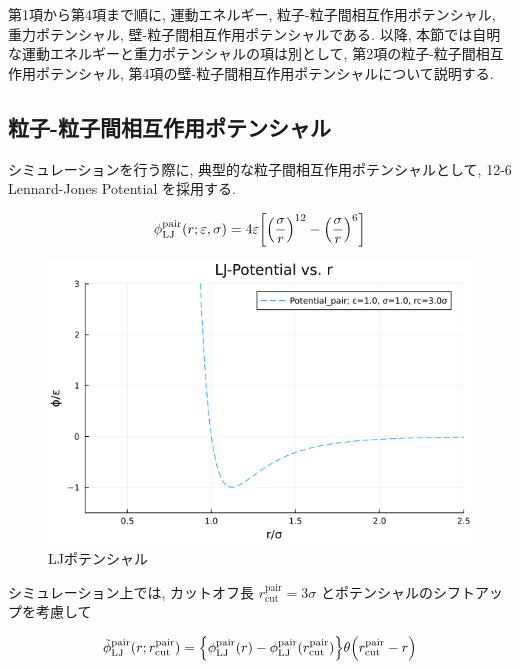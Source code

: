 第1項から第4項まで順に, 運動エネルギー, 粒子-粒子間相互作用ポテンシャル, 重力ポテンシャル, 壁-粒子間相互作用ポテンシャルである. 以降, 本節では自明な運動エネルギーと重力ポテンシャルの項は別として, 第2項の粒子-粒子間相互作用ポテンシャル, 第4項の壁-粒子間相互作用ポテンシャルについて説明する.

\subsection{粒子-粒子間相互作用ポテンシャル}

シミュレーションを行う際に, 典型的な粒子間相互作用ポテンシャルとして, 12-6 Lennard-Jones Potential を採用する.

\begin{align}
  \phi_{\text{LJ}}^{\text{pair}}(r; \varepsilon, \sigma) = 4\varepsilon \qty[\qty(\frac{\sigma}{r})^{12} - \qty(\frac{\sigma}{r})^{6}] 
\end{align}

\begin{figure}
  \centering
  \caption{LJポテンシャル}
  \label{}
  \includegraphics[scale=0.5]{image/LJ-Potential_pair.png}
\end{figure}

シミュレーション上では, カットオフ長 $r_{\text{cut}}^{\text{pair}}=3\sigma$ とポテンシャルのシフトアップを考慮して

\begin{align}
  \tilde{\phi}_{\text{LJ}}^{\text{pair}}(r;r_{\text{cut}}^{\text{pair}}) = \qty{\phi_{\text{LJ}}^{\text{pair}}(r) - \phi_{\text{LJ}}^{\text{pair}}(r_{\text{cut}}^{\text{pair}})}\theta \qty(r_{\text{cut}}^{\text{pair}}-r) \\
\end{align}

